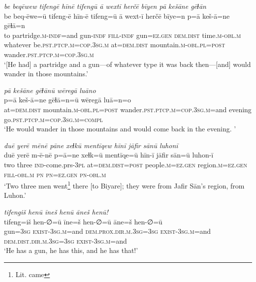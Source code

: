 \ea \label{ŠJ.7}
\textit{be beqēwew tifengē hīnē tifengū ā wextī herčē bīyen pā kešāne gēɫān} \\ 
\gll be beq-ēwe=ū tifeng-ē hīn-ē tifeng=ū ā wext-ī herčē bīye=n p=ā keš-ā=ne gēɫā=n \\ 
 to partridge\textsc{.m}\textsc{-indf}=and gun\textsc{-indf} \textsc{fill}\textsc{-indf} gun\textsc{=ez.gen} \textsc{dem.dist} time\textsc{.m}\textsc{-obl}\textsc{.m} whatever be\textsc{.pst}\textsc{.ptcp}\textsc{.m}\textsc{=cop}\textsc{.3sg}\textsc{.m} at=\textsc{dem.dist} mountain\textsc{.m}\textsc{-obl}\textsc{.pl}\textsc{=\textsc{post}} wander\textsc{.pst}\textsc{.ptcp}\textsc{.m}\textsc{=cop}\textsc{.3sg}\textsc{.m} \\ 
\glt `[He had] a partridge and a gun—of whatever type it was back then—[and] would wander in those mountains.'
\z 
 
\ea \label{ŠJ.8}
\textit{pā kešāne gēɫānū wēregā luāno} \\ 
\gll p=ā keš-ā=ne gēɫā=n=ū wēregā luā=n=o \\ 
 at=\textsc{dem.dist} mountain\textsc{.m}\textsc{-obl}\textsc{.pl}\textsc{=\textsc{post}} wander\textsc{.pst}\textsc{.ptcp}\textsc{.m}\textsc{=cop}\textsc{.3sg}\textsc{.m}=and evening go\textsc{.pst}\textsc{.ptcp}\textsc{.m}\textsc{=cop}\textsc{.3sg}\textsc{.m}\textsc{=compl} \\ 
\glt `He would wander in those mountains and would come back in the evening. '
\z 
 
\ea \label{ŠJ.9}
\textit{duē yerē mēnē pāne xeɫkū mentīqew hīnī jāfir sānū luhonī} \\ 
\gll duē yerē m-ē-nē p=ā=ne xeɫk=ū mentīqe=ū hīn-ī jāfir sān=ū luhon-ī \\ 
 two three \textsc{ind-}come.prs\textsc{-3pl} at=\textsc{dem.dist}\textsc{=\textsc{post}} people\textsc{.m}\textsc{=ez.gen} region\textsc{.m}\textsc{=ez.gen} \textsc{fill}\textsc{-obl}\textsc{.m} \textsc{pn} \textsc{pn}\textsc{=ez.gen} \textsc{pn}\textsc{-obl}\textsc{.m} \\ 
\glt `Two three men went\footnote{Lit. came} there [to Biyare]; they were from Jafir Sān’s region, from Luhon.'
\z 
 
\ea \label{ŠJ.12}
\textit{tifengiš henū īneš henū āneš henū!} \\ 
\gll tifeng=iš hen-∅=ū īne=š hen-∅=ū āne=š hen-∅=ū \\ 
 gun\textsc{=3sg} \textsc{exist}\textsc{-3sg}\textsc{.m}=and \textsc{dem.prox}\textsc{.dir}\textsc{.m}\textsc{.3sg}\textsc{=3sg} \textsc{exist}\textsc{-3sg}\textsc{.m}=and \textsc{dem.dist}\textsc{.dir}\textsc{.m}\textsc{.3sg}\textsc{=3sg} \textsc{exist-3sg.m}=and \\ 
\glt `He has a gun, he has this, and he has that!'
\z 
 
